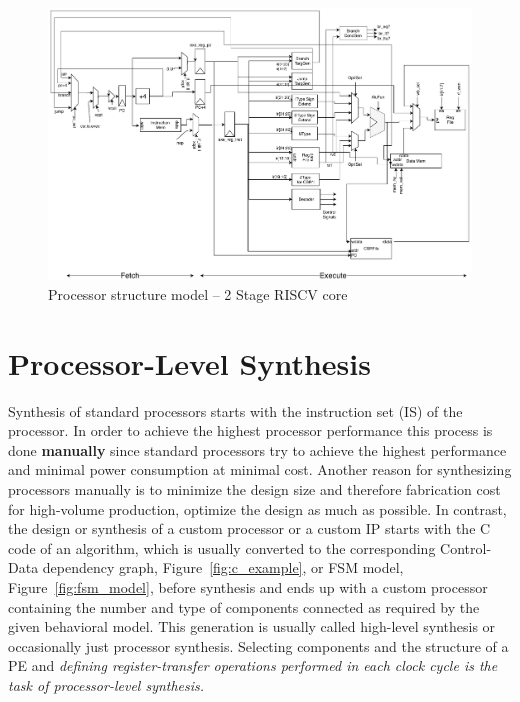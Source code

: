 \begin{figure}[!t]
    \centering
    \includegraphics[width=\textwidth]{figures/Introduction/2stage.pdf}
    \caption{Processor structure model -- 2 Stage RISCV core}
    \label{fig:proc_structure}
\end{figure}


\section{Processor-Level Synthesis}

Synthesis of standard processors starts with the instruction set (IS) of the processor.
In order to achieve the highest processor performance this process is done \textbf{manually} since standard processors try to achieve the highest performance and minimal power consumption at minimal cost.
Another reason for synthesizing processors manually is to minimize the design size and therefore fabrication cost for high-volume production, optimize the design as much as possible.
In contrast, the design or synthesis of a custom processor or a custom IP starts with the C code of an algorithm, which is usually converted to the corresponding Control-Data dependency graph, Figure~\ref{fig:c_example}, or FSM model, Figure~\ref{fig:fsm_model}, before synthesis and ends up with a custom processor containing the number and type of components connected as required by the given behavioral model.
This generation is usually called high-level synthesis or occasionally just processor synthesis.
Selecting components and the structure of a PE and \emph{defining register-transfer operations performed in each clock cycle is the task of processor-level synthesis.}

